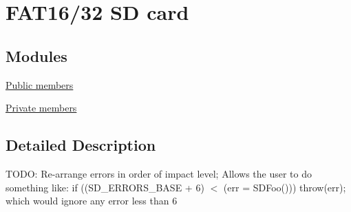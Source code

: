 \hypertarget{group__sd}{\section{\-F\-A\-T16/32 \-S\-D card}
\label{group__sd}
}
\subsection*{\-Modules}
\begin{DoxyCompactItemize}
\item 
\hyperlink{group__sd__public}{\-Public members}
\item 
\hyperlink{group__sd__private}{\-Private members}
\end{DoxyCompactItemize}


\subsection{\-Detailed \-Description}
\-T\-O\-D\-O\-: \-Re-\/arrange errors in order of impact level; \-Allows the user to do something like\-: if ((\-S\-D\-\_\-\-E\-R\-R\-O\-R\-S\-\_\-\-B\-A\-S\-E + 6) $<$ (err = \-S\-D\-Foo())) throw(err); which would ignore any error less than 6 